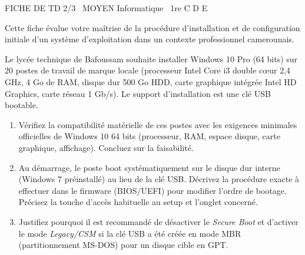 \documentclass[11pt]{article}
\begin{document}
\begin{tcolorbox}[enhanced,colback=popink,colframe=popink,arc=10pt,boxrule=0pt,left=12pt,right=12pt,top=9pt,bottom=9pt]
{\color{white}\popxbold\small FICHE DE TD 2/3 \textbullet\ MOYEN \hfill Informatique \textbullet\ 1re C D E\par}
\end{tcolorbox}
\vspace{4pt}
Cette fiche évalue votre maîtrise de la procédure d'installation et de configuration initiale d'un système d'exploitation dans un contexte professionnel camerounais.

\begin{exercice}
Le lycée technique de Bafoussam souhaite installer Windows 10 Pro (64 bits) sur 20 postes de travail de marque locale (processeur Intel Core i3 double cœur 2,4 GHz, 4 Go de RAM, disque dur 500 Go HDD, carte graphique intégrée Intel HD Graphics, carte réseau 1 Gb/s). Le support d'installation est une clé USB bootable.
\begin{enumerate}
    \item Vérifiez la compatibilité matérielle de ces postes avec les exigences minimales officielles de Windows 10 64 bits (processeur, RAM, espace disque, carte graphique, affichage). Concluez sur la faisabilité.
    \item Au démarrage, le poste boot systématiquement sur le disque dur interne (Windows 7 préinstallé) au lieu de la clé USB. Décrivez la procédure exacte à effectuer dans le firmware (BIOS/UEFI) pour modifier l'ordre de bootage. Précisez la touche d'accès habituelle au setup et l'onglet concerné.
    \item Justifiez pourquoi il est recommandé de désactiver le \textit{Secure Boot} et d'activer le mode \textit{Legacy/CSM} si la clé USB a été créée en mode MBR (partitionnement MS-DOS) pour un disque cible en GPT.
\end{enumerate}
\end{exercice}
\end{document}
